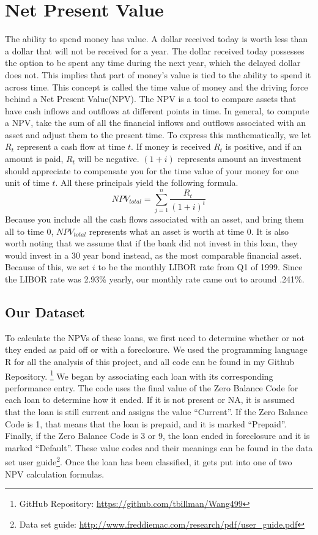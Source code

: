 \documentclass[12 pt]{uncw_thesis}
\theoremstyle{plain}
\theoremstyle{remark}
\theoremstyle{definition}
\begin{document}
\section{Net Present Value}
The ability to spend money has value. A dollar received today is worth less than a dollar that will not be received for a year. The dollar received today possesses the option to be spent any time during the next year, which the delayed dollar does not. This implies that part of money's value is tied to the ability to spend it across time. This concept is called the time value of money and the driving force behind a Net Present Value(NPV). The NPV is a tool to compare assets that have cash inflows and outflows at different points in time. In general, to compute a NPV, take the sum of all the financial inflows and outflows associated with an asset and adjust them to the present time. To express this mathematically, we let \(R_t\) represent a cash flow at time \(t\). If money is received \(R_t\) is positive, and if an amount is paid, \(R_t\) will be negative. \((1+i)\) represents amount an investment should appreciate to compensate you for the time value of your money for one unit of time \(t\). All these principals yield the following formula. 
\[NPV_{total} = \sum_{j=1}^n \frac{R_t}{(1+i)^t}\]
Because you include all the cash flows associated with an asset, and bring them all to time 0, \(NPV_{total}\) represents what an asset is worth at time 0. It is also worth noting that we assume that if the bank did not invest in this loan, they would invest in a 30 year bond instead, as the most comparable financial asset. Because of this, we set \(i\) to be the monthly LIBOR rate from Q1 of 1999. Since the LIBOR rate was 2.93\% yearly, our monthly rate came out to around .241\%.
\subsection{Our Dataset}
To calculate the NPVs of these loans, we first need to determine whether or not they ended as paid off or with a foreclosure. We used the programming language R for all the analysis of this project, and all code can be found in my Github Repository. \footnote{GitHub Repository: \href{https://github.com/tbillman/Wang499}{https://github.com/tbillman/Wang499}} We began by associating each loan with its corresponding performance entry. The code uses the final value of the Zero Balance Code for each loan to determine how it ended. If it is not present or NA, it is assumed that the loan is still current and assigns the value ``Current''. If the Zero Balance Code is 1, that means that the loan is prepaid, and it is marked ``Prepaid''. Finally, if the Zero Balance Code is 3 or 9, the loan ended in foreclosure and it is marked ``Default''. These value codes and their meanings can be found in the data set user guide\footnote{Data set guide: \href{http://www.freddiemac.com/research/pdf/user\_guide.pdf}{http://www.freddiemac.com/research/pdf/user\_guide.pdf}}. Once the loan has been classified, it gets put into one of two NPV calculation formulas.
\end{document}
